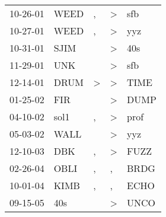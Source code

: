 \begin{supertabular}{p{0.07\textwidth}p{0.06\textwidth}p{0.02\textwidth}p{0.02\textwidth}p{0.06\textwidth}}
 10-26-01\textsuperscript{} &  WEED\textsuperscript{} &             , &  \textgreater &   sfb\textsuperscript{} \\
 10-27-01\textsuperscript{} &  WEED\textsuperscript{} &             , &  \textgreater &   yyz\textsuperscript{} \\
 10-31-01\textsuperscript{} &  SJIM\textsuperscript{} &               &  \textgreater &   40s\textsuperscript{} \\
 11-29-01\textsuperscript{} &   UNK\textsuperscript{} &               &  \textgreater &   sfb\textsuperscript{} \\
 12-14-01\textsuperscript{} &  DRUM\textsuperscript{} &  \textgreater &  \textgreater &  TIME\textsuperscript{} \\
 01-25-02\textsuperscript{} &   FIR\textsuperscript{} &               &  \textgreater &  DUMP\textsuperscript{} \\
 04-10-02\textsuperscript{} &  sol1\textsuperscript{} &             , &  \textgreater &  prof\textsuperscript{} \\
 05-03-02\textsuperscript{} &  WALL\textsuperscript{} &               &  \textgreater &   yyz\textsuperscript{} \\
 12-10-03\textsuperscript{} &   DBK\textsuperscript{} &             , &  \textgreater &  FUZZ\textsuperscript{} \\
 02-26-04\textsuperscript{} &  OBLI\textsuperscript{} &             , &             , &  BRDG\textsuperscript{} \\
 10-01-04\textsuperscript{} &  KIMB\textsuperscript{} &             , &             , &  ECHO\textsuperscript{} \\
 09-15-05\textsuperscript{} &   40s\textsuperscript{} &               &  \textgreater &  UNCO\textsuperscript{} \\
\end{supertabular}
